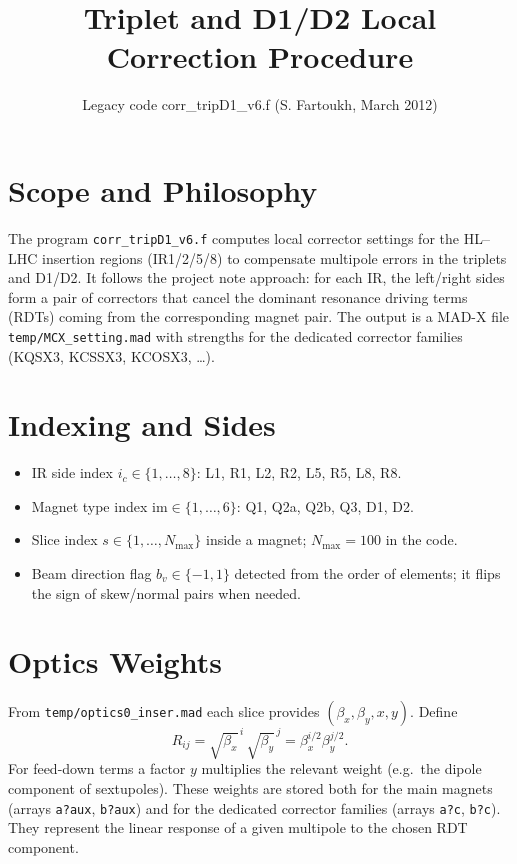 \documentclass[11pt]{article}
\title{Triplet and D1/D2 Local Correction Procedure}
\author{Legacy code corr\_tripD1\_v6.f (S. Fartoukh, March 2012)}
\date{}
\begin{document}
\maketitle

\section{Scope and Philosophy}
The program \texttt{corr\_tripD1\_v6.f} computes local corrector settings for the HL--LHC insertion regions (IR1/2/5/8) to compensate multipole errors in the triplets and D1/D2. It follows the project note approach: for each IR, the left/right sides form a pair of correctors that cancel the dominant resonance driving terms (RDTs) coming from the corresponding magnet pair. The output is a MAD-X file \texttt{temp/MCX\_setting.mad} with strengths for the dedicated corrector families (KQSX3, KCSSX3, KCOSX3, \ldots).

\section{Indexing and Sides}
\begin{itemize}
  \item IR side index $i_c \in \{1,\dots,8\}$: L1, R1, L2, R2, L5, R5, L8, R8.
  \item Magnet type index $\mathrm{im} \in \{1,\dots,6\}$: Q1, Q2a, Q2b, Q3, D1, D2.
  \item Slice index $s \in \{1,\dots,N_{\max}\}$ inside a magnet; $N_{\max}=100$ in the code.
  \item Beam direction flag $b_v \in \{-1,1\}$ detected from the order of elements; it flips the sign of skew/normal pairs when needed.
\end{itemize}

\section{Optics Weights}
From \texttt{temp/optics0\_inser.mad} each slice provides $(\beta_x,\beta_y,x,y)$. Define
\[
R_{ij} = \sqrt{\beta_x}^{\,i}\,\sqrt{\beta_y}^{\,j} = \beta_x^{i/2}\beta_y^{j/2}.
\]
For feed-down terms a factor $y$ multiplies the relevant weight (e.g.\ the dipole component of sextupoles). These weights are stored both for the main magnets (arrays \texttt{a?aux}, \texttt{b?aux}) and for the dedicated corrector families (arrays \texttt{a?c}, \texttt{b?c}). They represent the linear response of a given multipole to the chosen RDT component.
\end{document}
